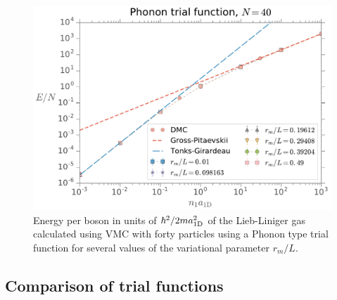 %
\begin{figure}[h!]
	\centering
	\includegraphics[width=0.75\linewidth]{./figures/phonon_energy-as-n-a1d_rm-var_Nb-40}
	\caption{ Energy per boson in units of $\hbar^2 / 2 m a_{ \mathrm{1D} }^2$ of the
		Lieb-Liniger gas calculated using VMC with forty particles using a Phonon
		type trial function for several values of the variational parameter $r_m /
		L$. }
	\label{fig:phonon-energy-as-n-a1d-rm-var-nb-40}
\end{figure}



\subsection{Comparison of trial functions}

